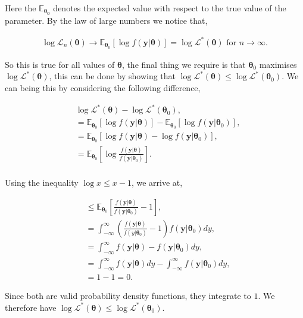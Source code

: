 \documentclass[honours,12pt]{unswthesis}
\newcommand{\E}{\mathbb{E}}
\newcommand{\y}{\mathbf{y}}
\numberwithin{equation}{section}
\begin{document}
\noindent Here the $\E_{\bm{\theta_{0}}}$ denotes the expected value with respect to the true value of the parameter. By the law of large numbers we notice that,

\begin{align*}
	\log{\mathcal{L}_{n}(\bm{\theta})} \rightarrow \E_{\bm{\theta}_{0}} \left[ \log{f(\y|\bm{\theta})} \right] = \log{\mathcal{L}}^{*}(\bm{\theta}) \text{ for } n \rightarrow \infty.
\end{align*}

\noindent So this is true for all values of $\bm{\theta}$, the final thing we require is that $\bm{\theta}_{0}$ maximises $\log{\mathcal{L}^{*}(\bm{\theta})}$, this can be done by showing that $\log{\mathcal{L}^{*}(\bm{\theta})} \leq \log{\mathcal{L}^{*}(\bm{\theta}_{0})}$. We can being this by considering the following difference,

\begin{align*}
	& \log{\mathcal{L}^{*}(\bm{\theta})} - \log{\mathcal{L}^{*}(\bm{\theta}_{0})},\\
	&= \E_{\bm{\theta}_{0}} \left[ \log{f(\y|\bm{\theta})} \right] - \E_{\bm{\theta}_{0}} \left[ \log{f(\y|\bm{\theta}_{0})} \right],\\
	&= \E_{\bm{\theta}_{0}} \left[ \log{f(\y|\bm{\theta})} - \log{f(\y|\bm{\theta}_{0})} \right],\\
	&= \E_{\bm{\theta}_{0}} \left[ \log{\frac{f(\y|\bm{\theta})}{f(\y|\bm{\theta}_{0})}} \right].\\
\end{align*}

\noindent Using the inequality $\log{x} \leq x - 1$, we arrive at,

\begin{align*}
	&\leq \E_{\bm{\theta}_{0}} \left[ \frac{f(\y|\bm{\theta})}{f(\y|\bm{\theta}_{0})} - 1 \right],\\
	&= \int_{-\infty}^{\infty} \left( \frac{f(\y|\bm{\theta})}{f(y|\bm{\theta}_{0})} - 1 \right) f(\y|\bm{\theta}_{0}) dy, \\
	&= \int_{-\infty}^{\infty} f(\y|\bm{\theta}) - f(\y|\bm{\theta}_{0}) dy, \\
	&= \int_{-\infty}^{\infty} f(\y|\bm{\theta}) dy -\int_{-\infty}^{\infty}  f(\y|\bm{\theta}_{0}) dy, \\
	&= 1 -1 = 0.
\end{align*}

\noindent Since both are valid probability density functions, they integrate to $1$. We therefore have $\log{\mathcal{L}^{*}(\bm{\theta})} \leq \log{\mathcal{L}^{*}(\bm{\theta}_{0})}$.\par
\end{document}
